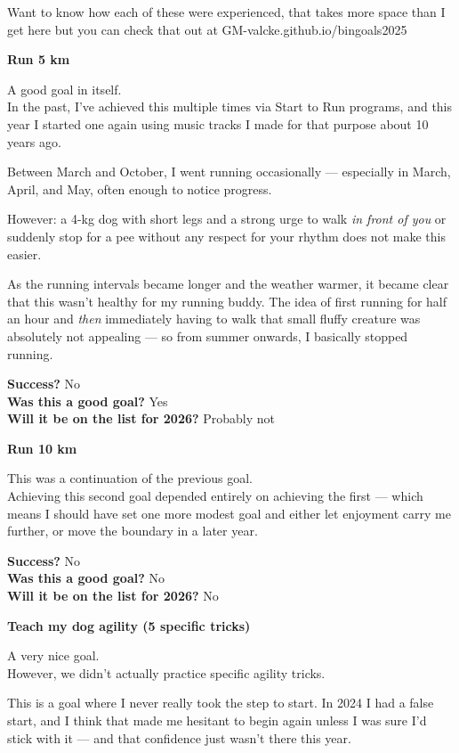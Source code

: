\documentclass[12pt]{article}
\begin{document}
Want to know how each of these were experienced, that takes more space
than I get here but you can check that out at
GM-valcke.github.io/bingoals2025

\textbf{Run 5 km}

A good goal in itself.\\
In the past, I've achieved this multiple times via Start to Run
programs, and this year I started one again using music tracks I made
for that purpose about 10 years ago.

Between March and October, I went running occasionally --- especially in
March, April, and May, often enough to notice progress.

However: a 4-kg dog with short legs and a strong urge to walk \emph{in
front of you} or suddenly stop for a pee without any respect for your
rhythm does not make this easier.

As the running intervals became longer and the weather warmer, it became
clear that this wasn't healthy for my running buddy. The idea of first
running for half an hour and \emph{then} immediately having to walk that
small fluffy creature was absolutely not appealing --- so from summer
onwards, I basically stopped running.

\textbf{Success?} No\\
\textbf{Was this a good goal?} Yes\\
\textbf{Will it be on the list for 2026?} Probably not

\textbf{Run 10 km}

This was a continuation of the previous goal.\\
Achieving this second goal depended entirely on achieving the first ---
which means I should have set one more modest goal and either let
enjoyment carry me further, or move the boundary in a later year.

\textbf{Success?} No\\
\textbf{Was this a good goal?} No\\
\textbf{Will it be on the list for 2026?} No

\textbf{Teach my dog agility (5 specific tricks)}

A very nice goal.\\
However, we didn't actually practice specific agility tricks.

This is a goal where I never really took the step to start. In 2024 I
had a false start, and I think that made me hesitant to begin again
unless I was sure I'd stick with it --- and that confidence just wasn't
there this year.
\end{document}
